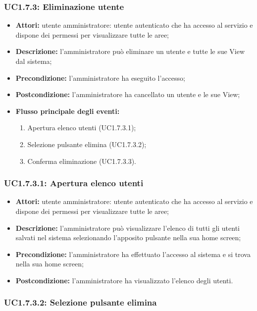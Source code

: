 \subsubsection{UC1.7.3: Eliminazione utente}

\begin{itemize}
    \item \textbf{Attori:} utente amministratore: utente autenticato che ha accesso al servizio e dispone dei permessi per visualizzare tutte le aree;
    \item \textbf{Descrizione:} l'amministratore può eliminare un utente e tutte le sue View\gloss{} dal sistema;
    \item \textbf{Precondizione:} l'amministratore ha eseguito l'accesso;
    \item \textbf{Postcondizione:} l'amministratore ha cancellato un utente e le sue View\gloss{};
    \item \textbf{Flusso principale degli eventi:}
    \begin{enumerate}
        \item Apertura elenco utenti (UC1.7.3.1);
        \item Selezione pulsante elimina (UC1.7.3.2);
        \item Conferma eliminazione (UC1.7.3.3).
    \end{enumerate}
\end{itemize}

\subsubsection{UC1.7.3.1: Apertura elenco utenti}

\begin{itemize}
    \item \textbf{Attori:} utente amministratore: utente autenticato che ha accesso al servizio e dispone dei permessi per visualizzare tutte le aree;
    \item \textbf{Descrizione:} l'amministratore può visualizzare l'elenco di tutti gli utenti salvati nel sistema selezionando l'apposito pulsante nella sua home screen;
    \item \textbf{Precondizione:} l'amministratore ha effettuato l'accesso al sistema e si trova nella sua home screen;
    \item \textbf{Postcondizione:} l'amministratore ha visualizzato l'elenco degli utenti.
\end{itemize}

\subsubsection{UC1.7.3.2: Selezione pulsante elimina}

